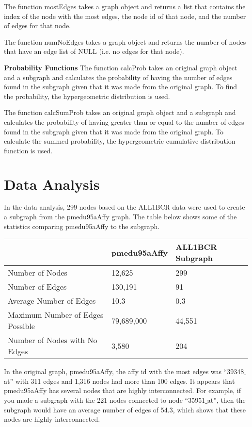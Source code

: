 \documentclass{article}[12pt]
\begin{document}
The function mostEdges takes a graph object and returns a list that 
contains the index of the node with the most edges, the node id of that
node, and the number of edges for that node. 


The function numNoEdges takes a graph object and returns the number of 
nodes that have an edge list of NULL (i.e. no edges for that node).


\noindent
{\bf Probability Functions}
\noindent
The function calcProb takes an original graph object and a subgraph and
calculates the probability of having the number of edges found in the 
subgraph given that it was made from the original graph.  To find the
probability, the hypergeometric distribution is used.


The function calcSumProb takes an original graph object and a subgraph
and calculates the probability of having greater than or equal to
the number of edges found in the subgraph given that it was made from
the original graph.  To calculate the summed probability, the 
hypergeometric cumulative distribution function is used.


\section*{Data Analysis}

In the data analysis, 299 nodes based on the ALL1BCR data were used to 
create a subgraph from the pmedu95aAffy graph.  The table below shows
some of the statistics comparing pmedu95aAffy to the subgraph.

\begin{center}
\begin{tabular}{|l|l|l|} \hline
& pmedu95aAffy & ALL1BCR Subgraph \\ \hline
Number of Nodes & 12,625 & 299 \\ \hline
Number of Edges & 130,191 & 91 \\ \hline
Average Number of Edges & 10.3 & 0.3 \\ \hline
Maximum Number of Edges Possible & 79,689,000 & 44,551 \\ \hline
Number of Nodes with No Edges & 3,580 & 204 \\ \hline 
\end{tabular}
   \end{center}

In the original graph, pmedu95aAffy, the affy id with the most edges was
``39348$\_$at'' with 311 edges and 1,316 nodes had more than 100 edges.  
It appears that pmedu95aAffy has several nodes that are highly 
interconnected.  For example, if you made a subgraph with the 221 nodes 
connected to node ``35951$\_$at'', then the subgraph would have an average
number of edges of 54.3, which shows that these nodes are highly 
interconnected.
\end{document}
